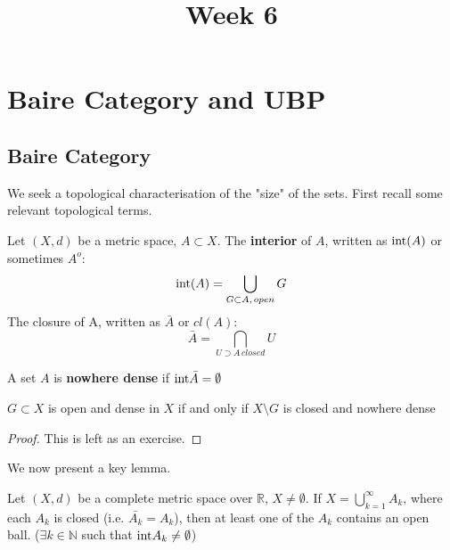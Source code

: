 \documentclass{article}
\title{Week 6}
\begin{document}
\author{\aut}
\maketitle

\section{Baire Category and UBP}

\subsection{Baire Category}

We seek a topological characterisation of the "size" of the sets. First recall some relevant topological terms.  

\begin{definition}
    Let $(X,d)$ be a metric space, $A\subset X$.
    The \textbf{interior} of $A$, written as $\textrm{int}(A)$ or sometimes $A^o$:
    $$ \textrm{int}(A)=\bigcup_{G\subset A,\,open}G$$
    The closure of A, written as $\bar{A}$ or $cl(A)$:
    $$ \bar{A}=\bigcap_{U\supset A\,closed}U$$

\end{definition}  

\begin{definition}
    A set $A$ is \textbf{nowhere dense} if $\textrm{int}{\bar{A}}=\emptyset$
\end{definition}

\begin{proposition}
\label{complement of nowhere}
    $G \subset X$ is open and dense in $X$ if and only if $X \setminus G$ is closed and nowhere dense
\end{proposition}   

\begin{proof}
    This is left as an exercise.
\end{proof}


We now present a key lemma.   


\begin{lemma}%
\label{baire lemma}
    Let $(X,d)$ be a complete metric space over $\mathbb{R}$, $X\neq\emptyset$.    
    If $X=\bigcup_{k=1}^\infty A_k$, where each $A_k$ is closed (i.e. $\bar{A_k}=A_k$), then at least one of the $A_k$ contains an open ball. ($\exists k \in \mathbb{N}$ such that $\textrm{int}{A_k}\neq\emptyset$)  
\end{lemma}    
\end{document}
